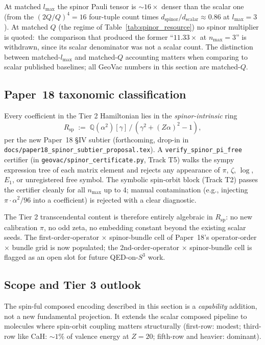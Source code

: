\documentclass[aps,pra,twocolumn,superscriptaddress,longbibliography]{revtex4-2}
\begin{document}
At matched $l_{\max}$ the spinor Pauli tensor is $\sim 16\times$
denser than the scalar one (from the $(2Q/Q)^4 = 16$ four-tuple
count times $d_{\mathrm{spinor}}/d_{\mathrm{scalar}} \approx 0.86$
at $l_{\max}=3$). At matched $Q$ (the regime of
Table~\ref{tab:spinor_resource}) no spinor multiplier is quoted:\ the
comparison that produced the former ``$11.33\times$ at $n_{\max}=3$'' is
withdrawn, since its scalar denominator was not a scalar count.  The
distinction between matched-$l_{\max}$
and matched-$Q$ accounting matters when comparing to scalar published
baselines; all GeoVac numbers in this section are matched-$Q$.

\subsection{Paper~18 taxonomic classification}
\label{subsec:spinor_paper18}

Every coefficient in the Tier 2 Hamiltonian lies in the
\emph{spinor-intrinsic} ring
\[
  R_{\mathrm{sp}} \;:=\; \mathbb{Q}(\alpha^2)[\gamma] \,/\, (\gamma^2 + (Z\alpha)^2 - 1),
\]
per the new Paper~18 \S IV subtier (forthcoming, drop-in in
\texttt{docs/paper18\_spinor\_subtier\_proposal.tex}). A
\texttt{verify\_spinor\_pi\_free} certifier (in
\texttt{geovac/spinor\_certificate.py}, Track T5) walks the sympy
expression tree of each matrix element and rejects any appearance of
$\pi$, $\zeta$, $\log$, $E_1$, or unregistered free symbol. The
symbolic spin-orbit block (Track T2) passes the certifier cleanly for all
$n_{\max}$ up to 4; manual contamination (e.g., injecting
$\pi \cdot \alpha^2 / 96$ into a coefficient) is rejected with a
clear diagnostic.

The Tier 2 transcendental content is therefore entirely algebraic in
$R_{\mathrm{sp}}$: no new calibration $\pi$, no odd zeta, no
embedding constant beyond the existing scalar seeds. The
first-order-operator $\times$ spinor-bundle cell of Paper~18's
operator-order $\times$ bundle grid is now populated; the
2nd-order-operator $\times$ spinor-bundle cell is flagged as an open
slot for future QED-on-$S^3$ work.

\subsection{Scope and Tier 3 outlook}
\label{subsec:spinor_scope}

The spin-ful composed encoding described in this section is a
\emph{capability} addition, not a new fundamental projection. It
extends the scalar composed pipeline to molecules where spin-orbit
coupling matters structurally (first-row: modest; third-row like CaH:
$\sim 1\%$ of valence energy at $Z=20$; fifth-row and heavier:
dominant).
\end{document}

